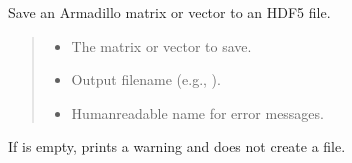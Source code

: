 \documentclass[a4paper,10pt,english]{sphinxmanual}
\begin{document}
\begin{fulllineitems}
\label{\detokenize{api/io-utils:_CPPv4I0EN9IMPaCT_IO8saveDataEvRK1TRK6stringRK6string}}\label{\detokenize{api/io-utils:_CPPv3I0EN9IMPaCT_IO8saveDataERK1TRK6stringRK6string}}\label{\detokenize{api/io-utils:_CPPv2I0EN9IMPaCT_IO8saveDataERK1TRK6stringRK6string}}
\pysigstartsignatures
\pysigstartmultiline
\pysigline
{}
\pysiglinewithargsret
{}
{\sphinxparamcomma {}\sphinxparamcomma {}}
{}
\pysigstopmultiline
\pysigstopsignatures
\sphinxAtStartPar
Save an Armadillo matrix or vector to an HDF5 file.
\begin{quote}\begin{description}
\begin{itemize}
\item {} 
\sphinxAtStartPar
{} \textendash{} The matrix or vector to save.

\item {} 
\sphinxAtStartPar
{} \textendash{} Output filename (e.g., ).

\item {} 
\sphinxAtStartPar
{} \textendash{} Human\sphinxhyphen{}readable name for error messages.

\end{itemize}

\end{description}\end{quote}

\sphinxAtStartPar
If  is empty, prints a warning and does not create a file.

\end{fulllineitems}
\end{document}
